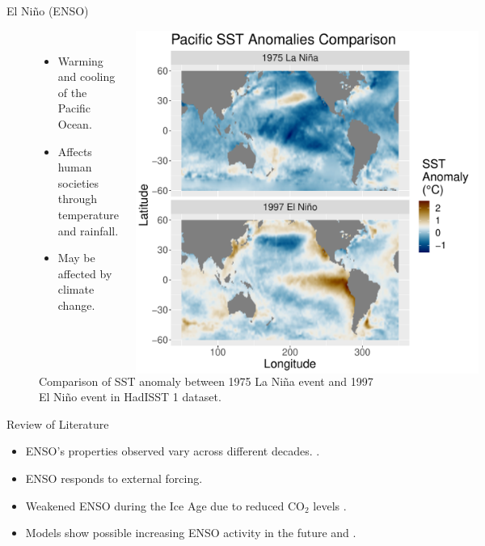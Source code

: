 \documentclass{beamer}
\begin{document}
\begin{frame}
  \begin{block}{El Niño (ENSO)}
    \begin{figure}
      \begin{columns}
        \begin{itemize}
        \item Warming and cooling of the Pacific Ocean.
        \item Affects human societies through temperature and rainfall. \citep{ropelewski1987global}
        \item May be affected by climate change.
        \end{itemize}
        \caption{Comparison of SST anomaly between 1975 La Niña event and 1997 El Niño event in HadISST 1 dataset. \citep{rayner2003global}}
        \includegraphics[width=1.0\textwidth]{figures/intro_fig.pdf}
      \end{columns}
    \end{figure}
  \end{block}
  \vfill

  \begin{block}{Review of Literature}
    \begin{itemize}
    \item ENSO's properties observed vary across different decades. \citep{lubbecke2014assessing}.
    \item ENSO responds to external forcing.
    \item Weakened ENSO during the Ice Age due to reduced CO$_2$ levels \citep{zhu2017reduced}.
    \item Models show possible increasing ENSO activity in the future \citep{zheng2017response} and \citep{maher2018enso}.
    \end{itemize}
  \end{block}
  \vfill


\end{frame}
\end{document}
